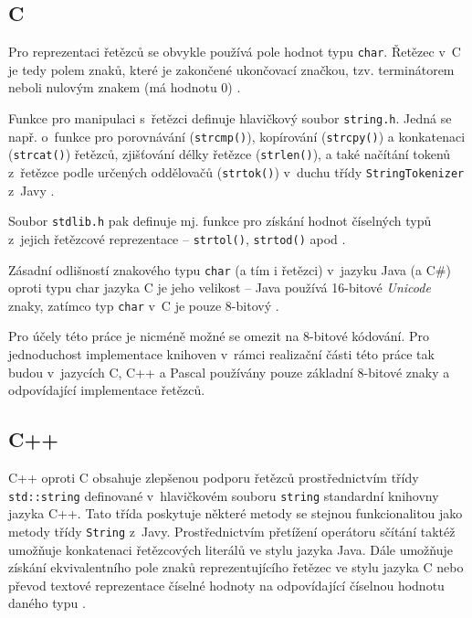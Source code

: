 \documentclass[czech,BP]{thesiskiv}
\begin{document}
\subsection{C}
Pro reprezentaci řetězců se obvykle používá pole hodnot typu \texttt{char}. Řetězec v~C je tedy polem znaků, které je zakončené ukončovací značkou, tzv. terminátorem neboli nulovým znakem (má hodnotu 0) \cite{cpp-guide-chararray}.\par
Funkce pro manipulaci s~řetězci definuje hlavičkový soubor \texttt{string.h}. Jedná se např. o~funkce pro porovnávání (\texttt{strcmp()}), kopírování (\texttt{strcpy()}) a konkatenaci (\texttt{strcat()}) řetězců, zjišťování délky řetězce (\texttt{strlen()}), a také načítání tokenů z~řetězce podle určených oddělovačů (\texttt{strtok()}) v~duchu třídy \texttt{StringTokenizer} z~Javy \cite{cpp-guide-cstring}.\par
Soubor \texttt{stdlib.h} pak definuje mj. funkce pro získání hodnot číselných typů z~jejich řetězcové reprezentace -- \texttt{strtol()}, \texttt{strtod()} apod \cite{cpp-guide-cstdlib}.\par
Zásadní odlišností znakového typu \texttt{char} (a tím i řetězci) v~jazyku Java (a C\#) oproti typu char jazyka C je jeho velikost -- Java používá 16-bitové \textit{Unicode} znaky, zatímco typ \texttt{char} v~C je pouze 8-bitový \cite{cpp-guide-types}.\par
Pro účely této práce je nicméně možné se omezit na 8-bitové kódování. Pro jednoduchost implementace knihoven v~rámci realizační části této práce tak budou v~jazycích C, C++ a Pascal používány pouze základní 8-bitové znaky a odpovídající implementace řetězců.

\subsection{C++}
C++ oproti C obsahuje zlepšenou podporu řetězců prostřednictvím třídy \texttt{std::string} definované v~hlavičkovém souboru \texttt{string} standardní knihovny jazyka C++. Tato třída poskytuje některé metody se stejnou funkcionalitou jako metody třídy \texttt{String} z~Javy. Prostřednictvím přetížení operátoru sčítání taktéž umožňuje konkatenaci řetězcových literálů ve stylu jazyka Java. Dále umožňuje získání ekvivalentního pole znaků reprezentujícího řetězec ve stylu jazyka C nebo převod textové reprezentace číselné hodnoty na odpovídající číselnou hodnotu daného typu \cite{cpp-guide-string, cpp-guide-stdstring}.
\end{document}

